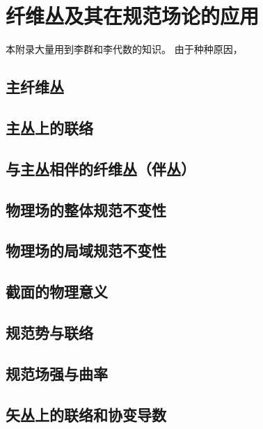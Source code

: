 \chapter[纤维丛及其在规范场论的应用]{\\纤维丛及其在规范场论的应用}

本附录大量用到李群和李代数的知识。
由于种种原因，

\section{主纤维丛}

\section{主丛上的联络}

\section{与主丛相伴的纤维丛（伴丛）}

\section{物理场的整体规范不变性}

\section{物理场的局域规范不变性}

\section{截面的物理意义}

\section{规范势与联络}

\section{规范场强与曲率}

\section{矢丛上的联络和协变导数}
